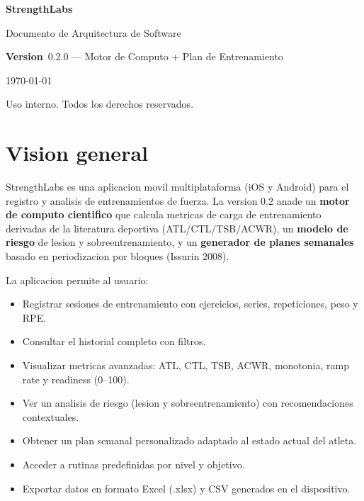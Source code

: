 \documentclass[12pt, a4paper]{article}
\begin{document}
\begin{titlepage}
  \centering
  \vspace*{3cm}
  {\Huge\bfseries\textcolor{primary}{StrengthLabs}\par}
  \vspace{0.5cm}
  {\large Documento de Arquitectura de Software\par}
  \vspace{2cm}
  {\large\textbf{Version}\ 0.2.0 --- Motor de Computo + Plan de Entrenamiento\par}
  \vspace{0.5cm}
  {\large\today\par}
  \vfill
  {\small Uso interno. Todos los derechos reservados.\par}
\end{titlepage}

\tableofcontents
\newpage

\section{Vision general}

StrengthLabs es una aplicacion movil multiplataforma (iOS y Android) para el registro y analisis de
entrenamientos de fuerza. La version 0.2 anade un \textbf{motor de computo cientifico} que calcula
metricas de carga de entrenamiento derivadas de la literatura deportiva (ATL/CTL/TSB/ACWR),
un \textbf{modelo de riesgo} de lesion y sobreentrenamiento, y un \textbf{generador de planes
semanales} basado en periodizacion por bloques (Issurin 2008).

La aplicacion permite al usuario:
\begin{itemize}
  \item Registrar sesiones de entrenamiento con ejercicios, series, repeticiones, peso y RPE.
  \item Consultar el historial completo con filtros.
  \item Visualizar metricas avanzadas: ATL, CTL, TSB, ACWR, monotonia, ramp rate y readiness (0--100).
  \item Ver un analisis de riesgo (lesion y sobreentrenamiento) con recomendaciones contextuales.
  \item Obtener un plan semanal personalizado adaptado al estado actual del atleta.
  \item Acceder a rutinas predefinidas por nivel y objetivo.
  \item Exportar datos en formato Excel (.xlsx) y CSV generados en el dispositivo.
\end{itemize}
\end{document}
